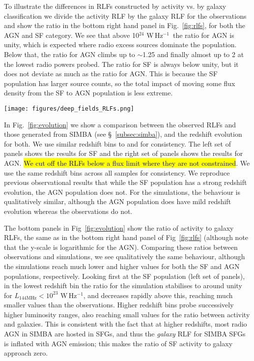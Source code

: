 \documentclass[usenatbib,fleqn,letters]{mnras}
\newcommand{\wphz}{$\,$W$\,$Hz$^{-1}$}
\newcommand{\llof}{$L_{\textrm{144MHz}}$}
\begin{document}
To illustrate the differences in RLFs constructed by activity vs. by galaxy classification we divide the activity RLF by the galaxy RLF for the observations and show the ratio in the bottom right hand panel in Fig.~\ref{fig:rlfs}, for both the AGN and SF category. We see that above 10$^{24}\,$\wphz\ the ratio for AGN is unity, which is expected where radio excess sources dominate the population. Below that, the ratio for AGN climbs up to $\sim$1.25 and finally almost up to 2 at the lowest radio powers probed. The ratio for SF is always below unity, but it does not deviate as much as the ratio for AGN. This is because the SF population has larger source counts, so the total impact of moving some flux density from the SF to AGN population is less extreme. 

\begin{figure*}
    \centering
    \texttt{[image: figures/deep\_fields\_RLFs.png]}
    \caption{Caption}
    \label{fig:rlfs}
\end{figure*}

In Fig.~\ref{fig:evolution} we show a comparison between the observed RLFs and those generated from SIMBA (see \S~\ref{subsec:simba}), and the redshift evolution for both.  We use similar redshift bins to \cite{kondapally_cosmic_2022} and \cite{cochrane_lofar_2023} for consistency. The left set of panels shows the results for SF and the right set of panels shows the results for AGN. \hl{We cut off the RLFs below a flux limit where they are not constrained}. We use the same redshift bins across all samples for consistency. We reproduce previous observational results that while the SF population has a strong redshift evolution, the AGN population does not. For the simulations, the behaviour is qualitatively similar, although the AGN population does have mild redshift evolution whereas the observations do not.

The bottom panels in Fig~\ref{fig:evolution} show the ratio of activity to galaxy RLFs, the same as in the bottom right hand panel of Fig~\ref{fig:rlfs} (although note that the y-scale is logarithmic for the AGN). Comparing these ratios between observations and simulations, we see qualitatively the same behaviour, although the simulations reach much lower and higher values for both the SF and AGN populations, respectively. Looking first at the SF population (left set of panels), in the lowest redshift bin the ratio for the simulation stabilises to around unity for \llof $<10^{23}\,$\wphz , and decreases rapidly above this, reaching much smaller values than the observations. Higher redshift bins probe successively higher luminosity ranges, also reaching small values for the ratio between activity and galaxies. This is consistent with the fact that at higher redshifts, most radio AGN in SIMBA are hosted in SFGs, and thus the \textit{galaxy} RLF for SIMBA SFGs is inflated with AGN emission; this makes the ratio of SF activity to galaxy approach zero. 
\end{document}
